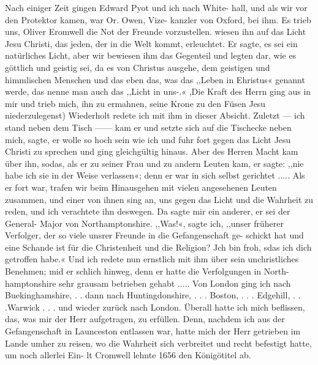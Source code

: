 Nach einiger Zeit gingen Edward Pyot und ich nach White-
hall, und als wir vor den Protektor kamen, war Or. Owen, Vize-
kanzler von Oxford, bei ihm. Es trieb uns, Oliver Eromwell die
Not der Freunde vorzustellen.   wiesen ihn auf das Licht
Jesu Christi, das jeden, der in die Welt kommt, erleuchtet.
Er sagte, es sei ein natürliches Licht, aber wir bewiesen ihm das
Gegenteil und legten dar, wie es göttlich und geistig sei, da es
von Christus ausgehe, dem geistigen und himmlischen Menschen
und das eben das, was das ,,Leben in Ehristus« genannt werde,
das nenne man auch das ,,Licht in uns-.« ,Die Kraft des Herrn
ging aus in mir und trieb mich, ihn zu ermahnen, seine Krone
zu den Füsen Jesu niederzulegenst) Wiederholt redete ich mit
ihm in dieser Absicht. Zuletzt — ich stand neben dem Tisch ——
kam er und setzte sich auf die Tischecke neben mich, sagte, er wolle
so hoch sein wie ich und fuhr fort gegen das Licht Jesu Christi
zu sprechen und ging gleichgültig hinaus. Aber des Herren Macht
kam über ihn, sodas, als er zu seiner Frau und zu andern
Leuten kam, er sagte: ,,nie habe ich sie in der Weise verlassen«;
denn er war in sich selbst gerichtet .....
Als er fort war, trafen wir beim Hinausgehen mit vielen
angesehenen Leuten zusammen, und einer von ihnen sing an, uns
gegen das Licht und die Wahrheit zu reden, und ich verachtete
ihn deswegen. Da sagte mir ein anderer, er sei der General-
Major von Northamptonshire. ,,Was!«, sagte ich, ,,unser früherer
Verfolger, der so viele unsrer Freunde in die Gefangenschaft ge-
schickt hat und eine Schande ist für die Christenheit und die
Religion? Jch bin froh, sdas ich dich getroffen habe.« Und ich
redete nun ernstlich mit ihm über sein unchristliches Benehmen;
mid er schlich hinweg, denn er hatte die Verfolgungen in North-
hamptonshire sehr grausam betrieben gehabt .....
Von London ging ich nach Buekinghamshire, . . dann nach
Huntingdonshire, . . . Boston, . . . Edgehill, . . .Warwick . . .
und wieder zurück nach London. Überall hatte ich mich beflissen,
das, was mir der Herr aufgetragen, zu erfüllen. Denn, nachdem
ich aus der Gefangenschaft in Launceston entlassen war, hatte mich
der Herr getrieben im Lande umher zu reisen, wo die Wahrheit
sich verbreitet und recht befestigt hatte, um noch allerlei Ein-
lt Cromwell lehnte 1656 den Königötitel ab.


